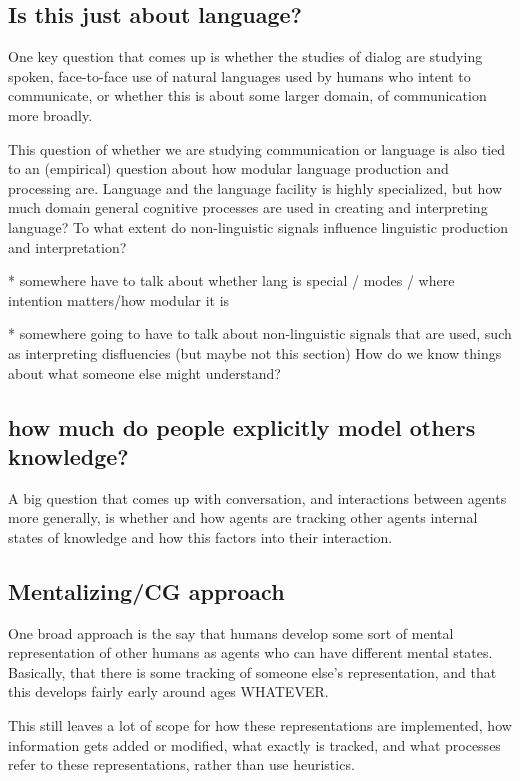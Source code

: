 \documentclass[]{article}
\begin{document}
\subsection{Is this just about language?}

One key question that comes up is whether the studies of dialog are studying spoken, face-to-face use of natural languages used by humans who intent to communicate, or whether this is about some larger domain, of communication more broadly. 

This question of whether we are studying communication or language is also tied to an (empirical) question about how modular language production and processing are. Language and the language facility is highly specialized, but how much domain general cognitive processes are used in creating and interpreting language? To what extent do non-linguistic signals influence linguistic production and interpretation? 




* somewhere have to talk about whether lang is special / modes / where intention matters/how modular it is

* somewhere going to have to talk about non-linguistic signals that are used, such as interpreting disfluencies (but maybe not this section) 
How do we know things about what someone else might understand?


\subsection{how much do people explicitly model others knowledge?}

A big question that comes up with conversation, and interactions between agents more generally, is whether and how agents are tracking other agents internal states of knowledge and how this factors into their interaction. 



\subsection{Mentalizing/CG approach}
One broad approach is the say that humans develop some sort of mental representation of other humans as agents who can have different mental states. Basically, that there is some tracking of someone else's representation, and that this develops fairly early around ages WHATEVER. 

This still leaves a lot of scope for how these representations are implemented, how information gets added or modified, what exactly is tracked, and what processes refer to these representations, rather than use heuristics. 
\end{document}
